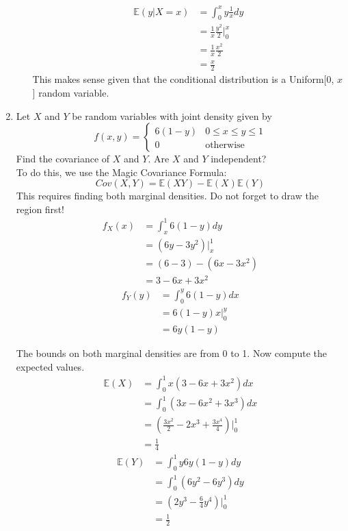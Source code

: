 \documentclass[12pt]{article}
\def\E{{\mathbb E}}
\begin{document}
\begin{enumerate}
\begin{enumerate}
\begin{align*}
\E(y|X = x) &= \int_0^x y \frac{1}{x} dy \\
&= \frac{1}{x} \frac{y^2}{2} \Bigr|_0^x \\
&= \frac{1}{x} \frac{x^2}{2} \\
&= \frac{x}{2}
\end{align*}
This makes sense given that the conditional distribution is a Uniform[0, $x$] random variable.
\end{enumerate}

\item Let $X$ and $Y$ be random variables with joint density given by
\[
f(x, y) = \begin{cases}
6(1-y) & 0 \leq x \leq y \leq 1\\
0 & \text{otherwise}
\end{cases}
\]
Find the covariance of $X$ and $Y$. Are $X$ and $Y$ independent?\\

To do this, we use the Magic Covariance Formula:
\[
Cov(X, Y) = \E(XY) - \E(X)\E(Y)
\]
This requires finding both marginal densities. Do not forget to draw the region first!
\begin{align*}
f_X(x) &= \int_x^1 6(1-y) dy \\
&= (6y - 3 y^2)\Bigr|_x^1 \\
&= (6 - 3) - (6x - 3x^2)  \\
&= 3 - 6x + 3x^2
\end{align*}
\begin{align*}
f_Y(y) &= \int_0^y 6(1-y) dx \\
&= 6(1-y)x \Bigr|_0^y \\
&= 6y(1-y)
\end{align*}

The bounds on both marginal densities are from 0 to 1. Now compute the expected values.
\begin{align*}
\E(X) &= \int_0^1 x (3 - 6x + 3x^2) dx\\
&= \int_0^1 (3x - 6x^2 + 3x^3) dx\\
&= \left(\frac{3x^2}{2} - 2x^3 + \frac{3x^4}{4}\right)\Bigr|_0^1\\
&= \frac{1}{4}
\end{align*}
\begin{align*}
\E(Y) &= \int_0^1 y 6y(1-y) dy\\
&= \int_0^1 (6y^2 - 6 y^3) dy \\
&= \left( 2y^3 - \frac{6}{4}y^4 \right)\Bigr|_0^1 \\
&= \frac{1}{2}
\end{align*}


\end{enumerate}
\end{document}
